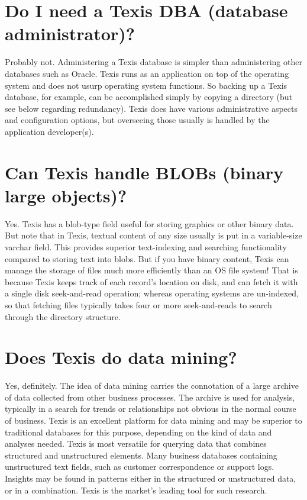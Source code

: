 \section{Do I need a Texis DBA (database administrator)? }

Probably not. Administering a Texis database is simpler than
administering other databases such as Oracle. Texis runs as an
application on top of the operating system and does not usurp
operating system functions. So backing up a Texis database, for
example, can be accomplished simply by copying a directory (but see
below regarding redundancy). Texis does have various administrative
aspects and configuration options, but overseeing those usually is
handled by the application developer(s).

\section{Can Texis handle BLOBs (binary large objects)? }

Yes. Texis has a blob-type field useful for storing graphics or other
binary data.  But note that in Texis, textual content of any size
usually is put in a variable-size varchar field.  This provides
superior text-indexing and searching functionality compared to storing
text into blobs.  But if you have binary content, Texis can manage the
storage of files much more efficiently than an OS file system!  That
is because Texis keeps track of each record's location on disk, and
can fetch it with a single disk seek-and-read operation; whereas
operating systems are un-indexed, so that fetching files typically
takes four or more seek-and-reads to search through the directory
structure.

\section{Does Texis do data mining? }
Yes, definitely.  The idea of data mining carries the connotation of a large archive of data collected from other business processes.  The archive is used for analysis, typically in a search for trends or relationships not obvious in the normal course of business.  Texis is an excellent platform for data mining and may be superior to traditional databases for this purpose, depending on the kind of data and analyses needed.  Texis is most versatile for querying data that combines structured and unstructured elements.  Many business databases containing unstructured text fields, such as customer correspondence or support logs.  Insights may be found in patterns either in the structured or unstructured data, or in a combination.  Texis is the market's leading tool for such research.

